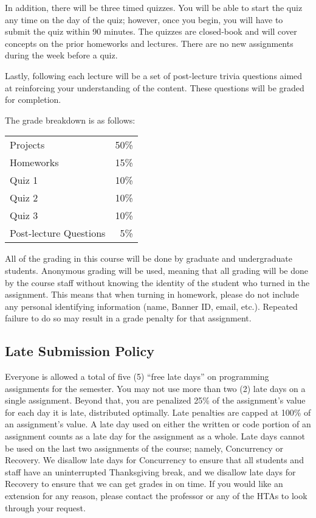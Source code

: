 \documentclass{article}
\begin{document}
In addition, there will be three timed quizzes. You will be able to start the quiz any time on the day of the quiz; however, once you begin, you will have to submit the quiz within 90 minutes. The quizzes are closed-book and will cover concepts on the prior homeworks and lectures. There are no new assignments during the week before a quiz.

Lastly, following each lecture will be a set of post-lecture trivia questions aimed at reinforcing your understanding of the content. These questions will be graded for completion.

The grade breakdown is as follows:
\begin{center}
    \begin{tabular}{ | l | r | }
    \hline
    Projects & 50\% \\
    Homeworks & 15\% \\
    Quiz 1 & 10\% \\
    Quiz 2 & 10\% \\
    Quiz 3 & 10\% \\
    Post-lecture Questions & 5\% \\
    \hline
    \end{tabular}
\end{center}

All of the grading in this course will be done by graduate and undergraduate students. Anonymous grading will be used, meaning that all grading will be done by the course staff without knowing the identity of the student who turned in the assignment. This means that when turning in homework, please do not include any personal identifying information (name, Banner ID, email, etc.). Repeated failure to do so may result in a grade penalty for that assignment.

\subsection{Late Submission Policy}
Everyone is allowed a total of five (5) ``free late days'' on programming assignments for the semester. You may not use more than two (2) late days on a single assignment. Beyond that, you are penalized 25\% of the assignment’s value for each day it is late, distributed optimally. Late penalties are capped at 100\% of an assignment’s value. A late day used on either the written or code portion of an assignment counts as a late day for the assignment as a whole. Late days cannot be used on the last two assignments of the course; namely, Concurrency or Recovery. We disallow late days for Concurrency to ensure that all students and staff have an uninterrupted Thanksgiving break, and we disallow late days for Recovery to ensure that we can get grades in on time. If you would like an extension for any reason, please contact the professor or any of the HTAs to look through your request.
\end{document}
